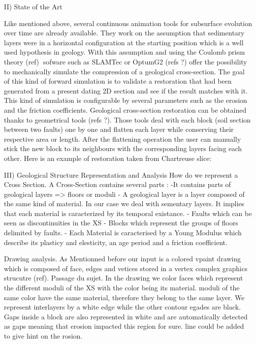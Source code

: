 \documentclass[12pt, a4paper]{memoir} %
\begin{document}
II) State of the Art

Like mentioned above, several continuous animation tools for subsurface evolution over time are already available. They work on the assumption that sedimentary layers were in a horizontal configuration at the starting position which is a well used hypothesis in geology. With this assumption and using the Coulomb prism theory (ref) sofware such as SLAMTec or OptumG2 (refs ?) offer the possibility to mechanically simulate the compression of a geological cross-section.
The goal of this kind of forward simulation is to validate a restoration that had been generated from a present dating 2D section and see if the result matches with it. This kind of simulation is configurable by several parameters such as the erosion and the friction coefficients.
Geological cross-section restoration can be obtained thanks to geometrical tools (refs ?). Those tools deal with each block (soil section between two faults) one by one and flatten each layer while conserving their respective area or length. After the flattening operation the user can manually stick the new block to its neighbours with the corresponding layers facing each other. Here is an example of restoration taken from Chartreuse slice:

III) Geological Structure Representation and Analysis
	How do we represent a Cross Section.
	A Cross-Section contains several parts : 
		-It contains parts of geological layers => floors or moduli
		- A geological layer is a layer composed of the same kind of material.
		In our case we deal with sementary layers. It implies that each material is caracterized by its temporal existance.	
	   	- Faults which can be seen as discontinuities in the XS
		- Blocks which represent the groups of floors delimited by faults.
		- Each Material is caracterised by a Young Modulus which describe its plasticy and elesticity,
		an age period and a friction coefficient.

Drawing analysis. As Mentionned before our input is a colored vpaint drawing which is composed of face, edges and vetices stored in 
a vertex complex graphics strucutre (ref). Passage du sujet.
In the drawing we color faces which represent the different moduli of the XS with the color being its material. moduli of the same color have the same material, therefore they belong to the same layer. We represent interlayers by a white edge while the other contour egades are black. Gaps inside a block are also represented in white and are automatically detected as gaps meaning that erosion impacted this region for sure. line could be added to give hint on the rosion.
\end{document}
